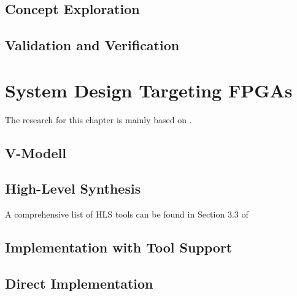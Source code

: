 \subsection{Concept Exploration}

\subsection{Validation and Verification}

\section{System Design Targeting FPGAs}
The research for this chapter is mainly based on \cite{GesslerRalf2014EES}.

\subsection{V-Modell}



\subsection{High-Level Synthesis}

A comprehensive list of HLS tools can be found in Section 3.3 of

\subsection{Implementation with Tool Support}


\subsection{Direct Implementation}

